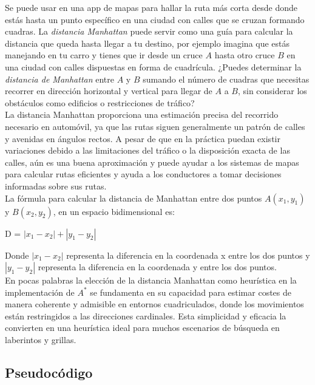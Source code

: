 Se puede usar en una app de mapas para hallar la ruta más corta desde donde estás hasta un punto específico en 
una ciudad con calles que se cruzan formando cuadras. La \textit{distancia Manhattan} puede servir 
como una guía para calcular la distancia que queda hasta llegar a tu destino, por ejemplo imagina que estás manejando en tu carro y tienes que ir desde un cruce $A$ hasta otro cruce $B$ en una ciudad con calles dispuestas en forma de cuadrícula. ¿Puedes determinar la \textit{distancia de Manhattan} entre $A$ y $B$ sumando el número de cuadras que necesitas recorrer en dirección horizontal y vertical para llegar de $A$ a $B$, sin considerar los obstáculos como edificios o restricciones de tráfico?\\ 


La distancia Manhattan proporciona una estimación precisa del recorrido necesario en automóvil, ya que las rutas siguen generalmente un patrón de calles y avenidas en ángulos rectos. A pesar de que en la práctica puedan existir variaciones debido a las limitaciones del tráfico o la disposición exacta de las calles, aún es una buena aproximación y puede ayudar a los sistemas de mapas para calcular rutas eficientes y ayuda a los conductores a tomar decisiones informadas sobre sus rutas.\\


La fórmula para calcular la distancia de Manhattan entre dos puntos $A(x_1, y_1)$ y $B(x_2,y_2)$,
en un espacio bidimensional es:
\begin{center}
    D = $|x_1 - x_2| + |y_1 - y_2|$
\end{center}

Donde $|x_1 - x_2|$ representa la diferencia en la coordenada x entre los dos puntos y  
$|y_1 - y_2|$ representa la diferencia en la coordenada y entre los dos puntos.\\ 


En pocas palabras la elección de la distancia Manhattan como heurística en la implementación de 
$A^{*}$ se fundamenta en su capacidad para estimar costes de manera coherente y admisible en entornos 
cuadriculados, donde los movimientos están restringidos a las direcciones cardinales. 
Esta simplicidad y eficacia la convierten en una heurística ideal para muchos escenarios de búsqueda 
en laberintos y grillas.

\subsection*{Pseudocódigo}

